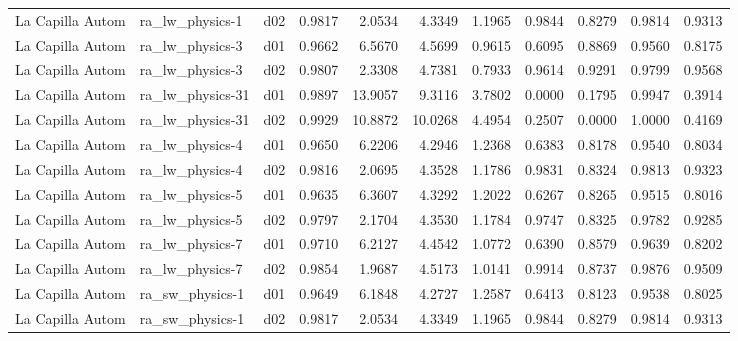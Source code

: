 \begin{longtable}{lllrrrrrrrr}
     La Capilla Autom  &       ra\_lw\_physics-1 &     d02 &   0.9817 &   2.0534 &   4.3349 &       1.1965 &        0.9844 &       0.8279 &           0.9814 &  0.9313 \\
     La Capilla Autom  &       ra\_lw\_physics-3 &     d01 &   0.9662 &   6.5670 &   4.5699 &       0.9615 &        0.6095 &       0.8869 &           0.9560 &  0.8175 \\
     La Capilla Autom  &       ra\_lw\_physics-3 &     d02 &   0.9807 &   2.3308 &   4.7381 &       0.7933 &        0.9614 &       0.9291 &           0.9799 &  0.9568 \\
     La Capilla Autom  &      ra\_lw\_physics-31 &     d01 &   0.9897 &  13.9057 &   9.3116 &       3.7802 &        0.0000 &       0.1795 &           0.9947 &  0.3914 \\
     La Capilla Autom  &      ra\_lw\_physics-31 &     d02 &   0.9929 &  10.8872 &  10.0268 &       4.4954 &        0.2507 &       0.0000 &           1.0000 &  0.4169 \\
     La Capilla Autom  &       ra\_lw\_physics-4 &     d01 &   0.9650 &   6.2206 &   4.2946 &       1.2368 &        0.6383 &       0.8178 &           0.9540 &  0.8034 \\
     La Capilla Autom  &       ra\_lw\_physics-4 &     d02 &   0.9816 &   2.0695 &   4.3528 &       1.1786 &        0.9831 &       0.8324 &           0.9813 &  0.9323 \\
     La Capilla Autom  &       ra\_lw\_physics-5 &     d01 &   0.9635 &   6.3607 &   4.3292 &       1.2022 &        0.6267 &       0.8265 &           0.9515 &  0.8016 \\
     La Capilla Autom  &       ra\_lw\_physics-5 &     d02 &   0.9797 &   2.1704 &   4.3530 &       1.1784 &        0.9747 &       0.8325 &           0.9782 &  0.9285 \\
     La Capilla Autom  &       ra\_lw\_physics-7 &     d01 &   0.9710 &   6.2127 &   4.4542 &       1.0772 &        0.6390 &       0.8579 &           0.9639 &  0.8202 \\
     La Capilla Autom  &       ra\_lw\_physics-7 &     d02 &   0.9854 &   1.9687 &   4.5173 &       1.0141 &        0.9914 &       0.8737 &           0.9876 &  0.9509 \\
     La Capilla Autom  &       ra\_sw\_physics-1 &     d01 &   0.9649 &   6.1848 &   4.2727 &       1.2587 &        0.6413 &       0.8123 &           0.9538 &  0.8025 \\
     La Capilla Autom  &       ra\_sw\_physics-1 &     d02 &   0.9817 &   2.0534 &   4.3349 &       1.1965 &        0.9844 &       0.8279 &           0.9814 &  0.9313 \\

\end{longtable}
